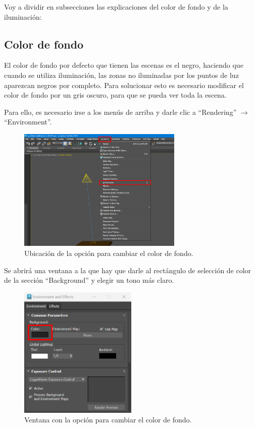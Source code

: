 \documentclass{article}
\begin{document}
\bigskip

Voy a dividir en subsecciones las explicaciones del color de fondo y de la iluminación:

\subsection{Color de fondo}

El color de fondo por defecto que tienen las escenas es el negro, haciendo que cuando se utiliza iluminación, las zonas no iluminadas por los puntos de luz aparezcan negros por completo. Para solucionar esto es necesario modificar el color de fondo por un gris oscuro, para que se pueda ver toda la escena.

\bigskip

Para ello, es necesario irse a los menús de arriba y darle clic a ``Rendering'' $\rightarrow$ ``Environment''.

\begin{figure}[H]
    \centering
    \includegraphics[width=0.7\textwidth]{imagenes/misc/bg-color1.png}
    \caption{Ubicación de la opción para cambiar el color de fondo.}
 \end{figure}

Se abrirá una ventana a la que hay que darle al rectángulo de selección de color de la sección ``Background'' y elegir un tono más claro.

\begin{figure}[H]
    \centering
    \includegraphics[width=0.5\textwidth]{imagenes/misc/bg-color2.png}
    \caption{Ventana con la opción para cambiar el color de fondo.}
 \end{figure}
\end{document}
